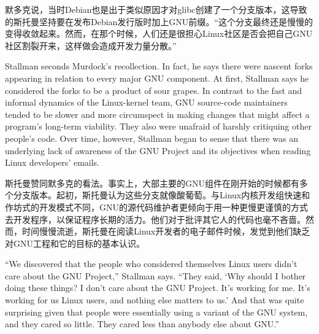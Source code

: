 \ifdefined\chs
默多克说，当时Debian也是出于类似原因才对glibc创建了一个分支版本，这导致的斯托曼坚持要在发布Debian发行版时加上GNU前缀。``这个分支最终还是慢慢的变得收敛起来。然而，在那个时候，人们还是很担心Linux社区是否会把自己GNU社区割裂开来，这样做会造成开发力量分散。''
\fi

\ifdefined\eng
Stallman seconds Murdock's recollection. In fact, he says there were nascent forks appearing in relation to every major GNU component. At first, Stallman says he considered the forks to be a product of sour grapes. In contrast to the fast and informal dynamics of the Linux-kernel team, GNU source-code maintainers tended to be slower and more circumspect in making changes that might affect a program's long-term viability. They also were unafraid of harshly critiquing other people's code. Over time, however, Stallman began to sense that there was an underlying lack of awareness of the GNU Project and its objectives when reading Linux developers' emails.
\fi

\ifdefined\chs
斯托曼赞同默多克的看法。事实上，大部主要的GNU组件在刚开始的时候都有多个分支版本。起初，斯托曼认为这些分支就像酸葡萄。与Linux内核开发组快速和作坊式的开发模式不同，GNU的源代码维护者更倾向于用一种更慢更谨慎的方式去开发程序，以保证程序长期的活力。他们对于批评其它人的代码也毫不吝啬。然而，时间慢慢流逝，斯托曼在阅读Linux开发者的电子邮件时候，发觉到他们缺乏对GNU工程和它的目标的基本认识。
\fi



\ifdefined\eng
``We discovered that the people who considered themselves Linux users didn't care about the GNU Project,'' Stallman says. ``They said, `Why should I bother doing these things? I don't care about the GNU Project. It's working for me. It's working for us Linux users, and nothing else matters to us.' And that was quite surprising given that people were essentially using a variant of the GNU system, and they cared so little. They cared less than anybody else about GNU.''
\fi

